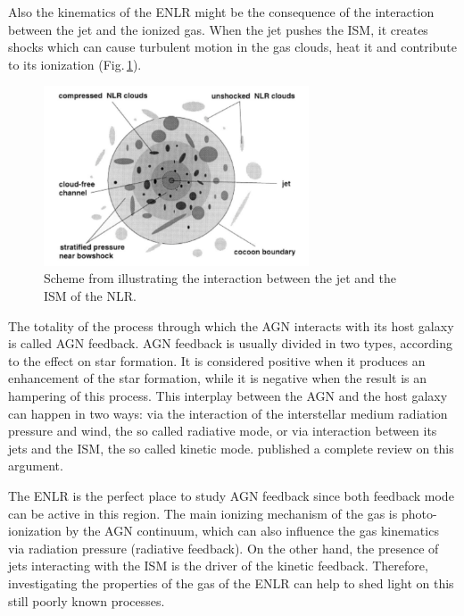 \documentclass[../thesis.tex]{subfiles}
\begin{document}
Also the kinematics of the ENLR might be the consequence of the interaction between the jet and the ionized gas.
When the jet pushes the ISM, it creates shocks which can
cause turbulent motion in the gas clouds, heat it and contribute to its ionization \citep[e.g.][]{Steffen97,Morse98,Rodriguez05,Contini12,Congiu17} (Fig.\,\ref{fig:interaction}).

\begin{figure}
\centering
\includegraphics[width=0.7\textwidth]{images/Jet-ism.pdf} 
\caption[]{Scheme from \citet{Steffen97} illustrating the interaction between the jet and the ISM of the NLR.}
\label{fig:interaction}
\end{figure}

The totality of the process through which the AGN interacts with its host galaxy is called AGN feedback.
AGN feedback is usually divided in two types, according to the effect on star formation.
It is considered positive when it produces an enhancement of the star formation, while it is negative when the result is an hampering of this process.
This interplay between the AGN and the host galaxy can happen in two ways: via the interaction of the interstellar medium radiation pressure and wind, the so called radiative mode, or via interaction between its jets and the ISM, the so called kinetic mode.
\citet{Fabian12} published a complete review on this argument.

The ENLR is the perfect place to study AGN feedback since both feedback mode can be active in this region.
The main ionizing mechanism of the gas is photo-ionization by the AGN continuum, which can also influence the gas kinematics via radiation pressure (radiative feedback).
On the other hand, the presence of jets interacting with the ISM is the driver of the kinetic feedback.
Therefore, investigating the properties of the gas of the ENLR can help to shed light on this still poorly known processes.



























\biblio
\end{document}
